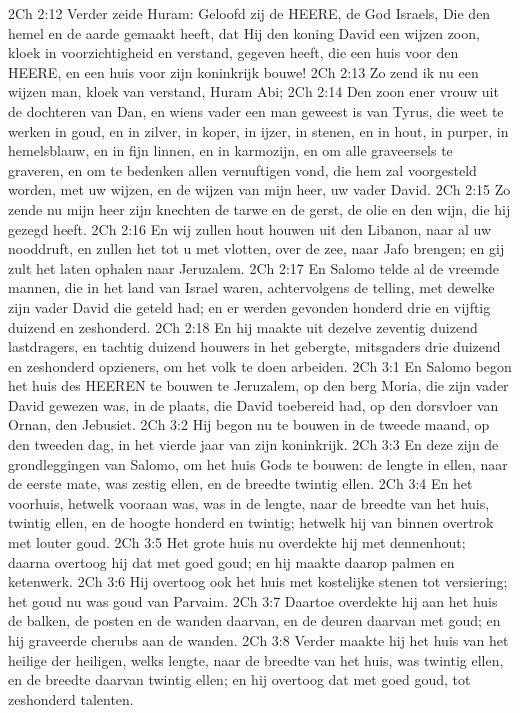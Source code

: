 2Ch 2:12  Verder zeide Huram: Geloofd zij de HEERE, de God Israels, Die den hemel en de aarde gemaakt heeft, dat Hij den koning David een wijzen zoon, kloek in voorzichtigheid en verstand, gegeven heeft, die een huis voor den HEERE, en een huis voor zijn koninkrijk bouwe!
2Ch 2:13  Zo zend ik nu een wijzen man, kloek van verstand, Huram Abi;
2Ch 2:14  Den zoon ener vrouw uit de dochteren van Dan, en wiens vader een man geweest is van Tyrus, die weet te werken in goud, en in zilver, in koper, in ijzer, in stenen, en in hout, in purper, in hemelsblauw, en in fijn linnen, en in karmozijn, en om alle graveersels te graveren, en om te bedenken allen vernuftigen vond, die hem zal voorgesteld worden, met uw wijzen, en de wijzen van mijn heer, uw vader David.
2Ch 2:15  Zo zende nu mijn heer zijn knechten de tarwe en de gerst, de olie en den wijn, die hij gezegd heeft.
2Ch 2:16  En wij zullen hout houwen uit den Libanon, naar al uw nooddruft, en zullen het tot u met vlotten, over de zee, naar Jafo brengen; en gij zult het laten ophalen naar Jeruzalem.
2Ch 2:17  En Salomo telde al de vreemde mannen, die in het land van Israel waren, achtervolgens de telling, met dewelke zijn vader David die geteld had; en er werden gevonden honderd drie en vijftig duizend en zeshonderd.
2Ch 2:18  En hij maakte uit dezelve zeventig duizend lastdragers, en tachtig duizend houwers in het gebergte, mitsgaders drie duizend en zeshonderd opzieners, om het volk te doen arbeiden.
2Ch 3:1  En Salomo begon het huis des HEEREN te bouwen te Jeruzalem, op den berg Moria, die zijn vader David gewezen was, in de plaats, die David toebereid had, op den dorsvloer van Ornan, den Jebusiet.
2Ch 3:2  Hij begon nu te bouwen in de tweede maand, op den tweeden dag, in het vierde jaar van zijn koninkrijk.
2Ch 3:3  En deze zijn de grondleggingen van Salomo, om het huis Gods te bouwen: de lengte in ellen, naar de eerste mate, was zestig ellen, en de breedte twintig ellen.
2Ch 3:4  En het voorhuis, hetwelk vooraan was, was in de lengte, naar de breedte van het huis, twintig ellen, en de hoogte honderd en twintig; hetwelk hij van binnen overtrok met louter goud.
2Ch 3:5  Het grote huis nu overdekte hij met dennenhout; daarna overtoog hij dat met goed goud; en hij maakte daarop palmen en ketenwerk.
2Ch 3:6  Hij overtoog ook het huis met kostelijke stenen tot versiering; het goud nu was goud van Parvaim.
2Ch 3:7  Daartoe overdekte hij aan het huis de balken, de posten en de wanden daarvan, en de deuren daarvan met goud; en hij graveerde cherubs aan de wanden.
2Ch 3:8  Verder maakte hij het huis van het heilige der heiligen, welks lengte, naar de breedte van het huis, was twintig ellen, en de breedte daarvan twintig ellen; en hij overtoog dat met goed goud, tot zeshonderd talenten.
